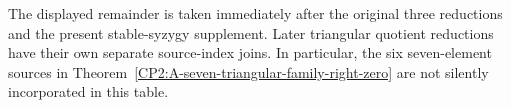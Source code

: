 \begin{remark*}
The displayed remainder is taken immediately after the original
three reductions and the present stable-syzygy supplement.
Later triangular quotient reductions have their own separate
source-index joins.  In particular, the six seven-element sources
in Theorem~\ref{CP2:A-seven-triangular-family-right-zero} are
not silently incorporated in this table.
\end{remark*}

